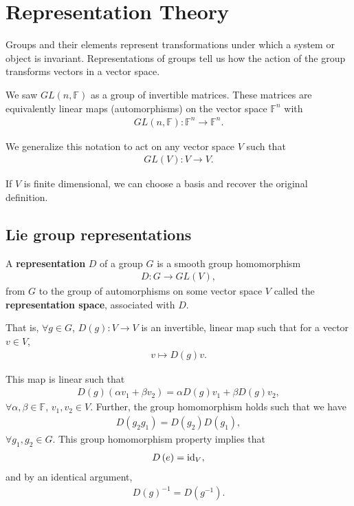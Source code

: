 \section{Representation Theory}

Groups and their elements represent transformations under which a system or object is invariant. Representations of groups tell us how the action of the group transforms vectors in a vector space.

We saw $GL \left( n, \mathbb{F} \right) $ as a group of invertible matrices. These matrices are equivalently linear maps (automorphisms) on the vector space $\mathbb{F}^{n}$ with
\begin{align}
    GL \left( n, \mathbb{F} \right) : \mathbb{F}^{n} \to \mathbb{F}^{n}
.\end{align}

We generalize this notation to act on any vector space $V$ such that
\begin{align}
    GL \left( V \right) : V \to V
.\end{align}

If $V$ is finite dimensional, we can choose a basis and recover the original definition.

\subsection{Lie group representations}

\begin{definition}
    A \textbf{representation} $D$ of a group $G$ is a smooth group homomorphism
    \begin{align}
        D : G \to GL \left( V \right) 
    ,\end{align}
    from $G$ to the group of automorphisms on some vector space $V$ called the \textbf{representation space}, associated with $D$.
\end{definition}

That is, $\forall g \in G$, $D \left( g \right) : V \to V$ is an invertible, linear map such that for a vector $v \in V$,
\begin{align}
    v \mapsto D \left( g \right) v
.\end{align}

This map is linear such that
\begin{align}
    D \left( g \right) \left( \alpha v_1 + \beta v_2 \right) = \alpha D \left( g \right) v_1 + \beta D \left( g \right) v_2
,\end{align}
$\forall \alpha, \beta \in \mathbb{F}$, $v_1, v_2 \in V$. Further, the group homomorphism holds such that we have
\begin{align}
    D \left( g_2 g_1 \right) = D \left( g_2 \right) D \left( g_1 \right) 
,\end{align}
$\forall g_1, g_2 \in G$. This group homomorphism property implies that
\begin{align}
    D \left( e \right) = \text{id}_{V}
,\end{align}
and by an identical argument,
\begin{align}
    D \left( g \right)^{-1} = D \left( g^{-1} \right) 
.\end{align}

